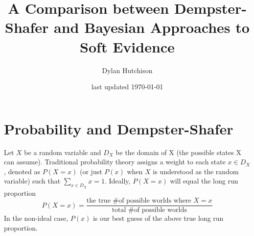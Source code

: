 \documentclass[letterpaper]{article}
\begin{document}
\thispagestyle{empty}
\pagestyle{empty} %

\author{Dylan Hutchison}
\title{A Comparison between Dempster-Shafer and Bayesian Approaches to Soft Evidence}
\date{last updated \today}
\maketitle


\section{Probability and Dempster-Shafer}
Let $X$ be a random variable and $D_X$ be the domain of X (the possible states X can assume).  Traditional probability theory assigns a weight to each state $x \in D_X$, denoted as $P(X=x)$ (or just $P(x)$ when $X$ is understood as the random variable) such that $\sum_{x \in D_X}x = 1$. Ideally, $P(X=x)$ will equal the long run proportion 
\[P(X=x) = \dfrac{\text{the true \# of possible worlds where } X=x}{\text{total \# of possible worlds}}\]
In the non-ideal case, $P(x)$ is our best guess of the above true long run proportion.
\end{document}
